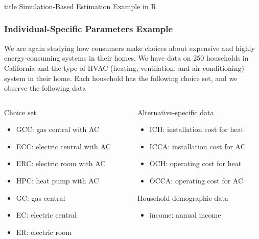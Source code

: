 \documentclass{beamer}
\begin{document}
\begin{frame}\frametitle{}
    \vfill
    \centering
    \begin{beamercolorbox}[center]{title}
        \Large Simulation-Based Estimation Example in R
    \end{beamercolorbox}
    \vfill
\end{frame}

\begin{frame}\frametitle{Individual-Specific Parameters Example}
    We are again studying how consumers make choices about expensive and highly energy-consuming systems in their homes. We have data on 250 households in California and the type of HVAC (heating, ventilation, and air conditioning) system in their home. Each household has the following choice set, and we observe the following data \\
    \vspace{3ex}
    \begin{columns}
    	\begin{column}{0.5\textwidth}
		    Choice set
		    \begin{itemize}
		    	\item GCC: gas central with AC
		    	\item ECC: electric central with AC
		    	\item ERC: electric room with AC
		    	\item HPC: heat pump with AC
		    	\item GC: gas central
		    	\item EC: electric central
		    	\item ER: electric room
		    \end{itemize}
		    \vspace{2ex}
	    \end{column}
	    \begin{column}{0.5\textwidth}
		    Alternative-specific data
		    \begin{itemize}
		    	\item ICH: installation cost for heat
		    	\item ICCA: installation cost for AC
		    	\item OCH: operating cost for heat
		    	\item OCCA: operating cost for AC
		    \end{itemize}
		    \vspace{2ex}
		    Household demographic data
		    \begin{itemize}
		    	\item income: annual income
		    \end{itemize}
		\end{column}
    \end{columns}
\end{frame}
\end{document}

